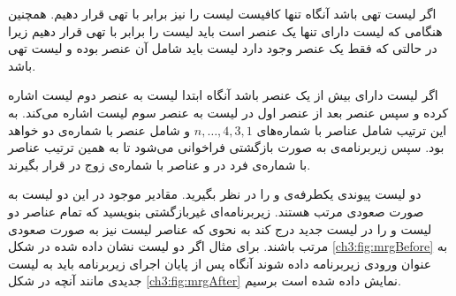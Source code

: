 اگر لیست {} تهی باشد  آنگاه تنها کافیست لیست {} را نیز برابر با تهی قرار دهیم. همچنین هنگامی که لیست {} دارای تنها یک عنصر است  باید لیست {} را برابر با تهی قرار دهیم زیرا در حالتی که فقط یک عنصر وجود دارد لیست {} باید شامل آن عنصر بوده و لیست {} تهی باشد. 

اگر لیست {} دارای بیش از یک عنصر باشد آنگاه ابتدا لیست {} به عنصر دوم لیست {} اشاره کرده و سپس عنصر بعد از عنصر اول در لیست {} به عنصر سوم لیست {} اشاره می‌کند. به این ترتیب {} شامل عناصر با شماره‌های {$n ,\ldots , 4,3,1$}  و {} شامل عنصر با شماره‌ی دو خواهد بود. سپس زیربرنامه‌ی {} به صورت بازگشتی  فراخوانی می‌شود تا به همین ترتیب عناصر با شماره‌ی فرد در {} و عناصر با شماره‌ی زوج در {} قرار بگیرند.

 دو لیست پیوندی یکطرفه‌ی {} و {} را در نظر بگیرید. مقادیر موجود در این دو لیست به صورت صعودی مرتب هستند. زیربرنامه‌ای غیربازگشتی بنویسید که تمام عناصر دو لیست {} و {} را در لیست جدید {} درج کند به نحوی که عناصر لیست {} نیز به صورت صعودی مرتب باشند. برای مثال اگر دو لیست نشان داده شده در شکل {\ref{ch3:fig:mrgBefore}} به عنوان ورودی زیربرنامه داده شوند آنگاه پس از پایان اجرای زیربرنامه باید به لیست جدیدی مانند آنچه در شکل {\ref{ch3:fig:mrgAfter}} نمایش داده شده است برسیم.

